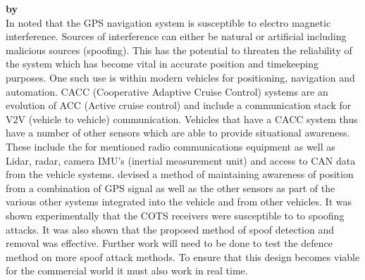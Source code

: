 \medskip

\textbf{\emph{} by \citeauthor{RN17}} \\
In \citeyear{RN17} \citeauthor{RN17} \cite{RN17} noted that the GPS navigation system is susceptible to electro magnetic interference. Sources of interference 
can either be natural or artificial including malicious sources (spoofing). This has the potential to threaten the reliability of the system which has become 
vital in accurate position and timekeeping purposes. One such use is within modern vehicles for positioning, navigation and automation. 
CACC (Cooperative Adaptive Cruise Control) systems are an evolution of ACC (Active cruise control) and include a communication stack for V2V (vehicle to vehicle) communication. 
Vehicles that have a CACC system thus have a number of other sensors which are able to provide situational awareness. These include the for mentioned radio
communications equipment as well as Lidar, radar, camera  IMU's (inertial measurement unit) and access to CAN data from the vehicle systems.
\citeauthor{RN17} devised a method of maintaining awareness of position from a combination of GPS signal as well as the other sensors as part of
the various other systems integrated into the vehicle and from other vehicles. It was shown experimentally that the COTS receivers were susceptible to
to spoofing attacks. It was also shown that the proposed method of spoof detection and removal was effective. Further work will need to be done
to test the defence method on more spoof attack methods. To ensure that this design becomes viable for the commercial world it must also work in real time.

\medskip

